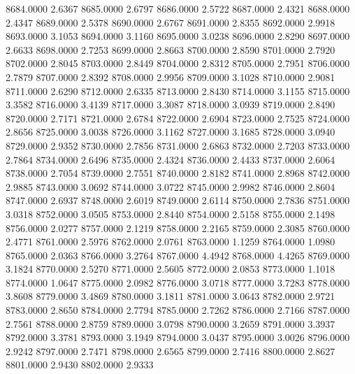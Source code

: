 8684.0000      2.6367
8685.0000      2.6797
8686.0000      2.5722
8687.0000      2.4321
8688.0000      2.4347
8689.0000      2.5378
8690.0000      2.6767
8691.0000      2.8355
8692.0000      2.9918
8693.0000      3.1053
8694.0000      3.1160
8695.0000      3.0238
8696.0000      2.8290
8697.0000      2.6633
8698.0000      2.7253
8699.0000      2.8663
8700.0000      2.8590
8701.0000      2.7920
8702.0000      2.8045
8703.0000      2.8449
8704.0000      2.8312
8705.0000      2.7951
8706.0000      2.7879
8707.0000      2.8392
8708.0000      2.9956
8709.0000      3.1028
8710.0000      2.9081
8711.0000      2.6290
8712.0000      2.6335
8713.0000      2.8430
8714.0000      3.1155
8715.0000      3.3582
8716.0000      3.4139
8717.0000      3.3087
8718.0000      3.0939
8719.0000      2.8490
8720.0000      2.7171
8721.0000      2.6784
8722.0000      2.6904
8723.0000      2.7525
8724.0000      2.8656
8725.0000      3.0038
8726.0000      3.1162
8727.0000      3.1685
8728.0000      3.0940
8729.0000      2.9352
8730.0000      2.7856
8731.0000      2.6863
8732.0000      2.7203
8733.0000      2.7864
8734.0000      2.6496
8735.0000      2.4324
8736.0000      2.4433
8737.0000      2.6064
8738.0000      2.7054
8739.0000      2.7551
8740.0000      2.8182
8741.0000      2.8968
8742.0000      2.9885
8743.0000      3.0692
8744.0000      3.0722
8745.0000      2.9982
8746.0000      2.8604
8747.0000      2.6937
8748.0000      2.6019
8749.0000      2.6114
8750.0000      2.7836
8751.0000      3.0318
8752.0000      3.0505
8753.0000      2.8440
8754.0000      2.5158
8755.0000      2.1498
8756.0000      2.0277
8757.0000      2.1219
8758.0000      2.2165
8759.0000      2.3085
8760.0000      2.4771
8761.0000      2.5976
8762.0000      2.0761
8763.0000      1.1259
8764.0000      1.0980
8765.0000      2.0363
8766.0000      3.2764
8767.0000      4.4942
8768.0000      4.4265
8769.0000      3.1824
8770.0000      2.5270
8771.0000      2.5605
8772.0000      2.0853
8773.0000      1.1018
8774.0000      1.0647
8775.0000      2.0982
8776.0000      3.0718
8777.0000      3.7283
8778.0000      3.8608
8779.0000      3.4869
8780.0000      3.1811
8781.0000      3.0643
8782.0000      2.9721
8783.0000      2.8650
8784.0000      2.7794
8785.0000      2.7262
8786.0000      2.7166
8787.0000      2.7561
8788.0000      2.8759
8789.0000      3.0798
8790.0000      3.2659
8791.0000      3.3937
8792.0000      3.3781
8793.0000      3.1949
8794.0000      3.0437
8795.0000      3.0026
8796.0000      2.9242
8797.0000      2.7471
8798.0000      2.6565
8799.0000      2.7416
8800.0000      2.8627
8801.0000      2.9430
8802.0000      2.9333
